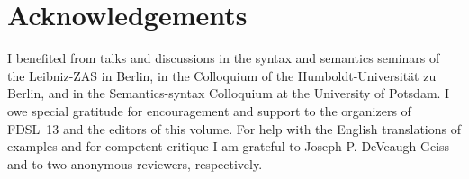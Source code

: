 \documentclass[output=paper]{langscibook}
\begin{document}

\section*{Acknowledgements}
I benefited from talks and discussions in the syntax and semantics seminars of the Leibniz-ZAS in Berlin, in the  Colloquium of the Humboldt-Universität zu Berlin, and in the Semantics-syntax Colloquium at the University of Potsdam. I owe special gratitude for encouragement and support to the organizers of FDSL~13 and the editors of this volume. For help with the English translations of  examples and for competent critique I am grateful to Joseph P. DeVeaugh-Geiss and to two anonymous reviewers, respectively.


\sloppy
\printbibliography[heading=subbibliography,notkeyword=this]
\end{document}
